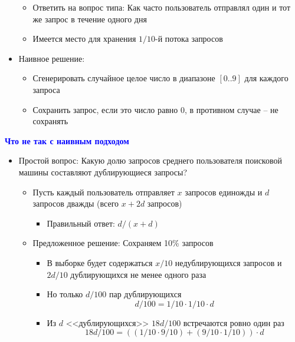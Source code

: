 \documentclass[landscape]{slides}
\begin{document}
\begin{normalsize}
\begin{slide}
\begin{itemize}
\begin{itemize}
  \item Ответить на вопрос типа: Как часто пользователь отправлял один и тот же запрос в течение одного дня

  \item Имеется место для хранения $1/10$-й потока запросов
  \end{itemize}

\item Наивное решение:

  \begin{itemize}
  \item Сгенерировать случайное целое число в диапазоне $[0..9]$ для каждого запроса

  \item Сохранить запрос, если это число равно $0$, в противном случае -- не сохранять
  \end{itemize}
\end{itemize}
\end{slide}


\begin{slide}
\textbf{\textcolor{blue}{Что не так с наивным подходом}}

\begin{itemize}
\item Простой вопрос: Какую долю запросов среднего пользователя поисковой машины составляют дублирующиеся запросы?

  \begin{itemize}
  \item Пусть каждый пользователь отправляет $x$ запросов единожды и $d$ запросов дважды (всего $x+2d$ запросов)

    \begin{itemize}
    \item Правильный ответ: $d/(x+d)$
    \end{itemize}

  \item Предложенное решение: Сохраняем 10\% запросов

    \begin{itemize}
    \item В выборке будет содержаться $x/10$ недублирующихся запросов и $2d/10$ дублирующихся не менее одного раза

    \item Но только $d/100$ пар дублирующихся
      $$d/100 = 1/10 \cdot 1/10 \cdot d $$

    \item Из $d$ <<дублирующихся>> $18d/100$ встречаются ровно один раз
      $$18d/100 = ((1/10 \cdot 9/10)+(9/10 \cdot 1/10)) \cdot d $$
    \end{itemize}
  \end{itemize}


\end{itemize}
\end{slide}
\end{normalsize}
\end{document}
